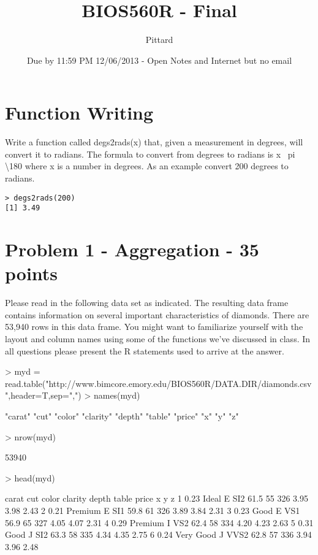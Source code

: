 \documentclass{article}
\title{BIOS560R - Final}
\date{Due by 11:59 PM 12/06/2013 - Open Notes and Internet but no email}
\author{Pittard}
\begin{document}

\maketitle

\section{Function Writing}
Write a function called degs2rads(x) that, given a measurement in
degrees, will convert it to radians. The formula to convert from degrees to radians is x \textasteriskcentered~pi \textbackslash 180 where x is a number in degrees. As an example convert 200 degrees to radians.

\begin{verbatim}
> degs2rads(200)
[1] 3.49
\end{verbatim}

\section{Problem 1 - Aggregation - 35 points}
Please read in the following data set as indicated. The resulting data frame contains information on several important characteristics of diamonds. There are 53,940 rows in this data frame. You might want to
familiarize yourself with the layout and column names using some of the functions we've discussed in class. In all questions please present the R statements used to arrive at the answer.

\begin{footnotesize}

\begin{Schunk}
\begin{Sinput}
> myd = read.table("http://www.bimcore.emory.edu/BIOS560R/DATA.DIR/diamonds.csv",header=T,sep=",") 
> names(myd)
\end{Sinput}
\begin{Soutput}
 [1] "carat"   "cut"     "color"   "clarity" "depth"   "table"   "price"   "x"       "y"       "z"      
\end{Soutput}
\begin{Sinput}
> nrow(myd)
\end{Sinput}
\begin{Soutput}
[1] 53940
\end{Soutput}
\begin{Sinput}
> head(myd)
\end{Sinput}
\begin{Soutput}
  carat       cut color clarity depth table price    x    y    z
1  0.23     Ideal     E     SI2  61.5    55   326 3.95 3.98 2.43
2  0.21   Premium     E     SI1  59.8    61   326 3.89 3.84 2.31
3  0.23      Good     E     VS1  56.9    65   327 4.05 4.07 2.31
4  0.29   Premium     I     VS2  62.4    58   334 4.20 4.23 2.63
5  0.31      Good     J     SI2  63.3    58   335 4.34 4.35 2.75
6  0.24 Very Good     J    VVS2  62.8    57   336 3.94 3.96 2.48
\end{Soutput}
\end{Schunk}
\end{footnotesize}
\end{document}
